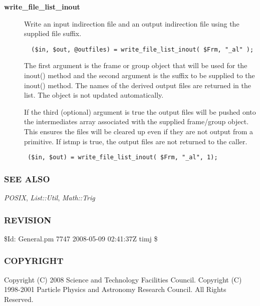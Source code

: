 \begin{description}
\begin{description}
\item[{\textbf{write\_file\_list\_inout}}] \mbox{}

Write an input indirection file and an output indirection file using the
supplied file suffix.

\begin{verbatim}
  ($in, $out, @outfiles) = write_file_list_inout( $Frm, "_al" );
\end{verbatim}


The first argument is the frame or group object that will be used
for the inout() method and the second argument is the suffix to
be supplied to the inout() method. The names of the derived output files
are returned in the list. The object is not updated automatically.



If the third (optional) argument
is true the output files will be pushed onto the intermediates
array associated with the supplied frame/group object. This ensures
the files will be cleared up even if they are not output from a 
primitive. If istmp is true, the output files are not returned to
the caller.

\begin{verbatim}
 ($in, $out) = write_file_list_inout( $Frm, "_al", 1);
\end{verbatim}
\end{description}
\subsubsection*{SEE ALSO\label{ORAC::General_SEE_ALSO}}


\emph{POSIX},
\emph{List::Util},
\emph{Math::Trig}

\subsubsection*{REVISION\label{ORAC::General_REVISION}}


\$Id: General.pm 7747 2008-05-09 02:41:37Z timj \$

\subsubsection*{COPYRIGHT\label{ORAC::General_COPYRIGHT}}


Copyright (C) 2008 Science and Technology Facilities Council.
Copyright (C) 1998-2001 Particle Physics and Astronomy Research
Council. All Rights Reserved.


\end{description}
